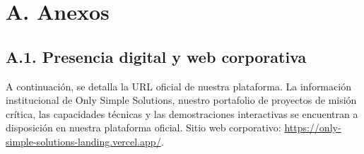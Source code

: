 \documentclass[11pt]{article}
\begin{document}

\tableofcontents
\clearpage

\section{A. Anexos}\label{a-anexos}

\subsection{A.1. Presencia digital y web corporativa}\label{a1-presencia-digital-y-web-corporativa}

A continuación, se detalla la URL oficial de nuestra plataforma. La información institucional de Only Simple Solutions, nuestro portafolio de proyectos de misión crítica, las capacidades técnicas y las demostraciones interactivas se encuentran a disposición en nuestra plataforma oficial. Sitio web corporativo: \url{https://only-simple-solutions-landing.vercel.app/}.

\ossFinalPage
\end{document}
